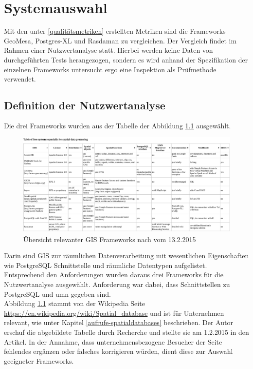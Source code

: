 \chapter{Systemauswahl}
Mit den unter \ref{qualitätsmetriken} erstellten Metriken sind die Frameworks GeoMesa, Postgres-XL und Rasdaman zu vergleichen.
Der Vergleich findet im Rahmen einer Nutzwertanalyse statt.
Hierbei werden keine Daten von durchgeführten Tests herangezogen, sondern es wird anhand der Spezifikation der einzelnen Frameworks untersucht ergo eine Inspektion als Prüfmethode verwendet.

\section{Definition der Nutzwertanalyse}
Die drei Frameworks wurden aus der Tabelle der Abbildung \ref{fig:spatialdatabases} ausgewählt.
\begin{figure}
\centering
\includegraphics[angle=90,width=.66\textwidth]{Abbildungen/table_spatialdatabases_13_2_15.pdf}
\caption[Übersicht relevanter GIS Frameworks]{Übersicht relevanter GIS Frameworks nach \cite{website:wiki-spatialdatabase} vom 13.2.2015}
\label{fig:spatialdatabases}
\end{figure}
Darin sind GIS zur räumlichen Datenverarbeitung mit wesentlichen Eigenschaften wie \mbox{PostgreSQL} Schnittstelle und räumliche Datentypen aufgelistet.
Entsprechend den Anforderungen wurden daraus drei Frameworks für die Nutzwertanalyse ausgewählt.
Anforderung war dabei, dass Schnittstellen zu PostgreSQL und \Gls{umn} gegeben sind.\\
Abbildung \ref{fig:spatialdatabases} stammt von der Wikipedia Seite \url{https://en.wikipedia.org/wiki/Spatial_database} und ist für Unternehmen relevant, wie unter Kapitel \ref{aufrufe-spatialdatabases} beschrieben.
Der Autor erschuf die abgebildete Tabelle durch Recherche und stellte sie am 1.2.2015 in den Artikel.
In der Annahme, dass unternehmensbezogene Besucher der Seite fehlendes ergänzen oder falsches korrigieren würden, dient diese zur Auswahl geeigneter Frameworks.

